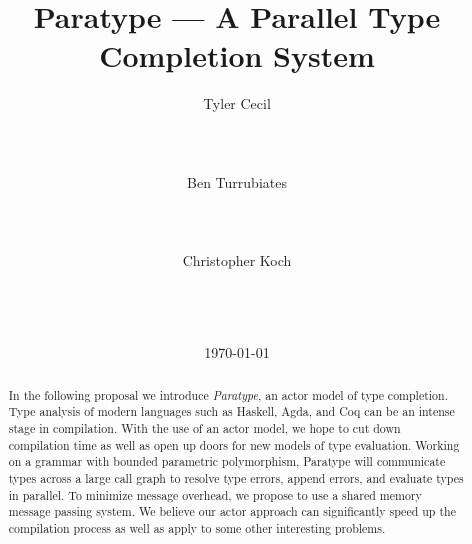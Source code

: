 \documentclass{acm_proc_article-sp}
\begin{document}
\title{Paratype --- A Parallel Type Completion System}


\author{
\alignauthor
Tyler Cecil\\
       \\
       \\
       \\
\alignauthor
Ben Turrubiates\\
       \\
       \\
       \\
\alignauthor
Christopher Koch\\
       \\
       \\
       \\
}
\date{\today}

\maketitle
\begin{abstract}
  In the following proposal we introduce \emph{Paratype}, an actor model of
  type completion. Type analysis of modern languages such as
  Haskell, Agda, and Coq can be an intense stage in compilation. With the use
  of an actor model, we hope to cut down compilation time as well as open up
  doors for new models of type evaluation. Working on a grammar with bounded
  parametric polymorphism, Paratype will communicate types across a large call
  graph to resolve type errors, append errors, and evaluate types in parallel.
  To minimize message overhead, we propose to use a shared memory message
  passing system. We believe our actor approach can significantly
  speed up the compilation process as well as apply to some other interesting
  problems.
\end{abstract}

\end{document}
